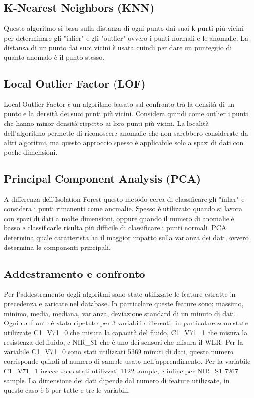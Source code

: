 \subsection{K-Nearest Neighbors (KNN)}
Questo algoritmo si basa sulla distanza di ogni punto dai suoi k punti più vicini per determinare gli "inlier" e gli "outlier" ovvero i punti normali e le anomalie. La distanza di un punto dai suoi vicini è usata quindi per dare un punteggio di quanto anomalo è il punto stesso.

\subsection{Local Outlier Factor (LOF)}
Local Outlier Factor è un algoritmo basato sul confronto tra la densità di un punto e la densità dei suoi punti più vicini. Considera quindi come outlier i punti che hanno minor densità rispetto ai loro punti più vicini. La località dell'algoritmo permette di riconoscere anomalie che non sarebbero considerate da altri algoritmi, ma questo approccio spesso è applicabile solo a spazi di dati con poche dimensioni.

\subsection{Principal Component Analysis (PCA)}
A differenza dell'Isolation Forest questo metodo cerca di classificare gli "inlier" e considera i punti rimanenti come anomalie. Spesso è utilizzato quando si lavora con spazi di dati a molte dimensioni, oppure quando il numero di anomalie è basso e classificarle risulta più difficile di classificare i punti normali. PCA determina quale caratterista ha il maggior impatto sulla varianza dei dati, ovvero determina le componenti principali.

\subsection{Addestramento e confronto} \label{AddestramentoEConfronto}

Per l'addestramento degli algoritmi sono state utilizzate le feature estratte in precedenza e caricate nel database. In particolare queste feature sono: massimo, minimo, media, mediana, varianza, deviazione standard di un minuto di dati. Ogni confronto è stato ripetuto per 3 variabili differenti, in particolare sono state utilizzate C1\_V71\_0 che misura la capacità del fluido, C1\_V71\_1 che misura la resistenza del fluido, e NIR\_S1 che è uno dei sensori che misura il WLR.
Per la variabile C1\_V71\_0 sono stati utilizzati 5369 minuti di dati, questo numero corrisponde quindi al numero di sample usato nell'apprendimento. Per la variabile C1\_V71\_1 invece sono stati utilizzati 1122 sample, e infine per NIR\_S1 7267 sample.
La dimensione dei dati dipende dal numero di feature utilizzate, in questo caso è 6 per tutte e tre le variabili.

